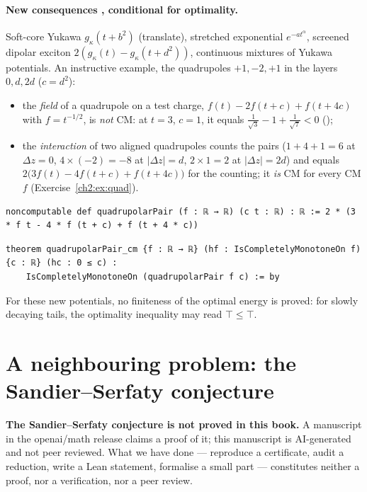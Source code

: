 \paragraph{New consequences \tierA, conditional for optimality.} Soft-core Yukawa
$g_\kappa(t+b^2)$ (translate), stretched exponential $e^{-at^\alpha}$, screened dipolar exciton
$2(g_\kappa(t)-g_\kappa(t+d^2))$, continuous mixtures of Yukawa potentials. An instructive example, the quadrupoles $+1,-2,+1$ in
the layers $0,d,2d$ ($c=d^2$):
\begin{itemize}
\item the \emph{field} of a quadrupole on a test charge, $f(t)-2f(t+c)+f(t+4c)$ with $f=t^{-1/2}$, is \emph{not}
CM: at $t=3$, $c=1$, it equals $\frac1{\sqrt3}-1+\frac1{\sqrt7}<0$ ();
\item the \emph{interaction} of two aligned quadrupoles counts the pairs ($1+4+1=6$ at $\Delta z=0$, $4\times(-2)=-8$ at
$|\Delta z|=d$, $2\times1=2$ at $|\Delta z|=2d$) and equals $2\bigl(3f(t)-4f(t+c)+f(t+4c)\bigr)$ \tierC{} for the counting;
it \emph{is} CM for every CM $f$ (Exercise~\ref{ch2:ex:quad}).
\end{itemize}
\begin{leanbox}
\begin{lstlisting}[style=chdeux]
noncomputable def quadrupolarPair (f : ℝ → ℝ) (c t : ℝ) : ℝ := 2 * (3 * f t - 4 * f (t + c) + f (t + 4 * c))
\end{lstlisting}
\begin{lstlisting}[style=chdeux]
theorem quadrupolarPair_cm {f : ℝ → ℝ} (hf : IsCompletelyMonotoneOn f) {c : ℝ} (hc : 0 ≤ c) :
    IsCompletelyMonotoneOn (quadrupolarPair f c) := by
\end{lstlisting}
\end{leanbox}
\noindent For these new potentials, no finiteness of the optimal energy is proved: for slowly decaying tails,
the optimality inequality may read $\top\le\top$.

\section{A neighbouring problem: the Sandier--Serfaty conjecture}\label{ch2:sec:ss}

\begin{warnbox}[: status]
\textbf{The Sandier--Serfaty conjecture is not proved in this book.} A manuscript in the openai/math release
claims a proof of it; this manuscript is AI-generated and not peer reviewed. What we have
done --- reproduce a certificate, audit a reduction, write a Lean statement, formalise a small part --- constitutes
neither a proof, nor a verification, nor a peer review.
\end{warnbox}

